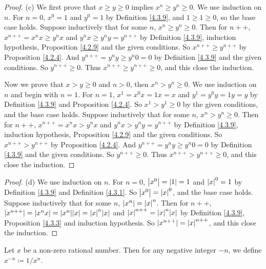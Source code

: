 \begin{proof}{(c)}
We first prove that \(x \geq y \geq 0\) implies \(x^n \geq y^n \geq 0\).
We use induction on \(n\).
For \(n = 0\), \(x^0 = 1\) and \(y^0 = 1\) by Definition \ref{4.3.9}, and \(1 \geq 1 \geq 0\), so the base case holds.
Suppose inductively that for some \(n\), \(x^n \geq y^n \geq 0\).
Then for \(n++\), \(x^{n++} = x^n x \geq y^n x\) and \(y^n x \geq y^n y = y^{n++}\) by Definition \ref{4.3.9}, induction hypothesis, Proposition \ref{4.2.9} and the given conditions.
So \(x^{n++} \geq y^{n++}\) by Proposition \ref{4.2.4}.
And \(y^{n++} = y^n y \geq y^n 0 = 0\) by Definition \ref{4.3.9} and the given conditions.
So \(y^{n++} \geq 0\).
Thus \(x^{n++} \geq y^{n++} \geq 0\), and this close the induction.

Now we prove that \(x > y \geq 0\) and \(n > 0\), then \(x^n > y^n \geq 0\).
We use induction on \(n\) and begin with \(n = 1\).
For \(n = 1\), \(x^1 = x^0 x = 1x = x\) and \(y^1 = y^0 y = 1y = y\) by Definition \ref{4.3.9} and Proposition \ref{4.2.4}.
So \(x^1 > y^1 \geq 0\) by the given conditions, and the base case holds.
Suppose inductively that for some \(n\), \(x^n > y^n \geq 0\).
Then for \(n++\), \(x^{n++} = x^n x > y^n x\) and \(y^n x > y^n y = y^{n++}\) by Definition \ref{4.3.9}, induction hypothesis, Proposition \ref{4.2.9} and the given conditions.
So \(x^{n++} > y^{n++}\) by Proposition \ref{4.2.4}.
And \(y^{n++} = y^n y \geq y^n 0 = 0\) by Definition \ref{4.3.9} and the given conditions.
So \(y^{n++} \geq 0\).
Thus \(x^{n++} > y^{n++} \geq 0\), and this close the induction.
\end{proof}

\begin{proof}{(d)}
We use induction on \(n\).
For \(n = 0\), \(\abs*{x^0} = \abs*{1} = 1\) and \(\abs*{x}^0 = 1\) by Definition \ref{4.3.9} and Definition \ref{4.3.1}.
So \(\abs*{x^0} = \abs*{x}^0\), and the base case holds.
Suppose inductively that for some \(n\), \(\abs*{x^n} = \abs*{x}^n\).
Then for \(n++\), \(\abs*{x^{n++}} = \abs*{x^n x} = \abs*{x^n}\abs*{x} = \abs*{x}^n \abs*{x}\) and \(\abs*{x}^{n++} = \abs*{x}^n \abs*{x}\) by Definition \ref{4.3.9}, Proposition \ref{4.3.3} and induction hypothesis.
So \(\abs*{x^{n++}} = \abs*{x}^{n++}\), and this close the induction.
\end{proof}

\begin{definition}\label{4.3.11}
Let \(x\) be a non-zero rational number.
Then for any negative integer \(-n\), we define \(x^{-n} \coloneqq 1 / x^n\).
\end{definition}

